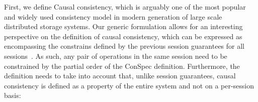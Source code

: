 \documentclass[journal,compsoc]{IEEEtran}
\begin{document}
First, we define Causal consistency, which is arguably one of the most popular and widely used consistency model in modern generation of large scale distributed storage systems. Our generic formulation allows for an interesting perspective on the definition of causal consistency, which can be expressed as encompassing the constrains defined by the previous session guarantees for all sessions~\cite{Ahamad:1993:PPC:165231.165264}. As such, any pair of operations in the same session need to be constrained by the partial order of the ConSpec definition. Furthermore, the definition needs to take into account that, unlike session guarantees, causal consistency is  defined as a property of the entire system and not on a per-session basis:

\end{document}
